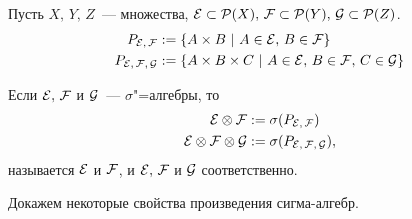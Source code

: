 \newpage
{}

\begin{definition}
    \label{lect4:def:mult}
    Пусть $X,\,Y,\,Z$~--- множества, $\mathcal{E}\subset \mathcal{P}(X),\, \mathcal{F} \subset\mathcal{P}(Y),\, \mathcal{G}\subset \mathcal{P}(Z)$.
    \begin{align*}
        P_{\CE,\,\F}        & := \{A\times B\ \vert\ A\in\CE,\,B\in\F \}                   \\
        P_{\CE,\,\F,\, \CG} & := \{A\times B\times C\ \vert\ A\in\CE,\,B\in\F,\,C\in\CG \}
    \end{align*}
\end{definition}

\begin{definition}
    Если $\mathcal{E},\,\mathcal{F} $ и $\mathcal{G}$~--- $\sigma$"=алгебры, то
    \begin{align*}
        \mathcal{E}\otimes\mathcal{F}            & :=\sigma(P_{\mathcal{E},\,\mathcal{F} })        \\
        \mathcal{E}\otimes\mathcal{F} \otimes\mathcal{G} & :=\sigma(P_{\mathcal{E},\,\mathcal{F} ,\,\mathcal{G}}),
    \end{align*}
    называется  $\mathcal{E}$ и $\mathcal{F} $, и $\mathcal{E},\, \mathcal{F} $ и $\mathcal{G}$ соответственно.
\end{definition}

Докажем некоторые свойства произведения сигма-алгебр.


